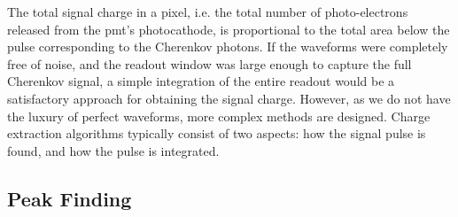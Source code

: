 The total signal charge in a pixel, i.e. the total number of photo-electrons released from the \gls{pmt}'s photocathode, is proportional to the total area below the pulse corresponding to the Cherenkov photons. If the waveforms were completely free of noise, and the readout window was large enough to capture the full Cherenkov signal, a simple integration of the entire readout would be a satisfactory approach for obtaining the signal charge. However, as we do not have the luxury of perfect waveforms, more complex methods are designed. Charge extraction algorithms typically consist of two aspects: how the signal pulse is found, and how the pulse is integrated.

\subsection{Peak Finding} \label{peakfinding}

